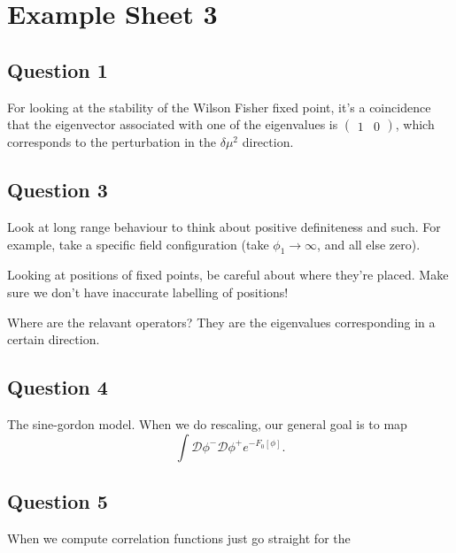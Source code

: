 \section{Example Sheet 3} 


\subsection{Question 1}
For looking at the stability 
of the Wilson Fisher fixed point, it's 
a coincidence that the eigenvector associated with one of the 
eigenvalues is $ \begin{pmatrix}  1 & 0  \end{pmatrix} $, which 
corresponds to the perturbation in the $ \delta \mu ^ 2 $ direction. 

\subsection{Question 3}
Look at long range behaviour 
to think about positive definiteness and such.
For example, take a specific field configuration (take $ \phi _ 1 \to \infty$, 
and all else zero). 

Looking at positions of fixed points, 
be careful about where they're placed. 
Make sure we don't have inaccurate labelling of positions! 

Where are the relavant operators? 
They are the eigenvalues corresponding in a certain direction. 

\subsection{Question 4}
The sine-gordon model. 
When we do rescaling, 
our general goal is to map 
\[
 \int \mathcal{ D } \phi ^ - \mathcal{ D  } \phi ^ + e ^{ - F _ 0 \left[  \phi  \right]  }. 
\] 

\subsection{Question 5}
When we compute correlation functions just go straight 
for the 
